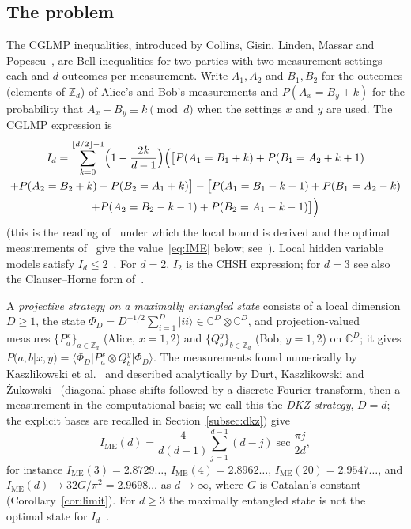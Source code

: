 \documentclass[11pt]{amsart}
\theoremstyle{definition}
\theoremstyle{remark}
\numberwithin{equation}{section}
\newcommand{\Z}{\mathbb{Z}}
\newcommand{\C}{\mathbb{C}}
\newcommand{\IME}{I_{\mathrm{ME}}}
\begin{document}
\subsection{The problem}
The CGLMP inequalities, introduced by Collins, Gisin, Linden, Massar and Popescu~\cite{CGLMP}, are Bell inequalities for
two parties with two measurement settings each and $d$ outcomes per measurement. Write $A_1,A_2$ and $B_1,B_2$ for the
outcomes (elements of $\Z_d$) of Alice's and Bob's measurements and $P(A_x=B_y+k)$ for the probability that
$A_x-B_y\equiv k\pmod d$ when the settings $x$ and $y$ are used. The CGLMP expression is
\begin{multline}\label{eq:cglmp}
I_d=\sum_{k=0}^{\lfloor d/2\rfloor-1}\Bigl(1-\frac{2k}{d-1}\Bigr)\Bigl(\bigl[P(A_1=B_1+k)+P(B_1=A_2+k+1)\\
+P(A_2=B_2+k)+P(B_2=A_1+k)\bigr]-\bigl[P(A_1=B_1-k-1)+P(B_1=A_2-k)\\
+P(A_2=B_2-k-1)+P(B_2=A_1-k-1)\bigr]\Bigr)
\end{multline}
(this is the reading of~\cite{CGLMP} under which the local bound is derived and the optimal measurements of~\cite{CGLMP}
give the value~\eqref{eq:IME} below; see~\cite[Section~2]{MS-classical}). Local hidden variable models satisfy
$I_d\le2$~\cite{CGLMP}. For $d=2$, $I_2$ is the CHSH expression; for $d=3$ see also the Clauser--Horne form
of~\cite{KKCZO}.

A \emph{projective strategy on a maximally entangled state} consists of a local dimension $D\ge1$, the state
$\Phi_D=D^{-1/2}\sum_{i=1}^D|ii\rangle\in\C^D\otimes\C^D$, and projection-valued measures $\{P^x_a\}_{a\in\Z_d}$
(Alice, $x=1,2$) and $\{Q^y_b\}_{b\in\Z_d}$ (Bob, $y=1,2$) on $\C^D$; it gives
$P(a,b|x,y)=\langle\Phi_D|P^x_a\otimes Q^y_b|\Phi_D\rangle$. The measurements found numerically by Kaszlikowski et
al.~\cite{KGZMZ} and described analytically by Durt, Kaszlikowski and \.Zukowski~\cite{DKZ} (diagonal phase shifts
followed by a discrete Fourier transform, then a measurement in the computational basis; we call this the \emph{DKZ
strategy}, $D=d$; the explicit bases are recalled in Section~\ref{subsec:dkz}) give
\begin{equation}\label{eq:IME}
\IME(d)=\frac{4}{d(d-1)}\sum_{j=1}^{d-1}(d-j)\sec\frac{\pi j}{2d},
\end{equation}
for instance $\IME(3)=2.8729\ldots$, $\IME(4)=2.8962\ldots$, $\IME(20)=2.9547\ldots$, and
$\IME(d)\to32G/\pi^2=2.9698\ldots$ as $d\to\infty$, where $G$ is Catalan's constant (Corollary~\ref{cor:limit}).
For $d\ge3$ the maximally entangled state is not the optimal state for $I_d$~\cite{ADGL}.
\end{document}
